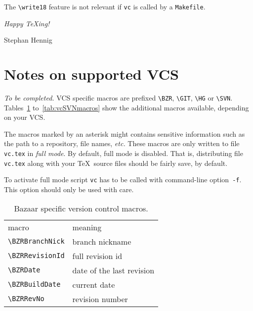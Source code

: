 \documentclass[11pt]{article}
\newcommand*{\full}{\makebox[0pt][r]{${}^{\mbox{\footnotesize\textasteriskcentered}}$}}
\begin{document}
The \verb+\write18+ feature is not relevant if \texttt{vc} is called by
a \texttt{Makefile}.

\nobreak
\bigskip
\nobreak
\begingroup
\raggedright
\itshape
Happy \TeX ing!\par
Stephan Hennig
\endgroup


\appendix
\section{Notes on supported VCS}
\label{sec:notes}

\emph{To be completed.}  VCS specific macros are prefixed \verb+\BZR+,
\verb+\GIT+, \verb+\HG+ or \verb+\SVN+.  Tables~\ref{tab:vcBZRmacros}
to~\ref{tab:vcSVNmacros} show the additional macros available, depending
on your VCS.

The macros marked by an asterisk might contains sensitive information
such as the path to a repository, file names, \emph{etc.}  These macros
are only written to file \texttt{vc.tex} in \emph{full mode}.  By
default, full mode is disabled.  That is, distributing file
\texttt{vc.tex} along with your \TeX\ source files should be fairly
save, by default.

To activate full mode script \texttt{vc} has to be called with
command-line option~\verb+-f+.  This option should only be used with
care.

\begin{table}[p]
  \centering\small
  \begin{tabularx}{\textwidth}{p{12em}>{\raggedright\arraybackslash}X}
    macro & meaning\\\addlinespace \toprule\addlinespace
    \full\verb+\BZRBranchNick+ & branch nickname\\
    \verb+\BZRRevisionId+ & full revision id\\
    \verb+\BZRDate+ & date of the last revision\\
    \verb+\BZRBuildDate+ & current date\\
    \verb+\BZRRevNo+ & revision number\\
  \end{tabularx}
  \caption{Bazaar specific version control macros.}
  \label{tab:vcBZRmacros}
\end{table}
\end{document}

